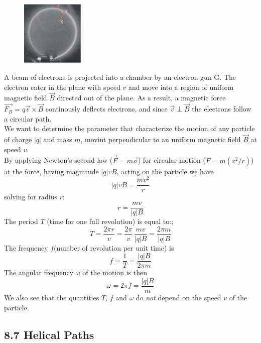\documentclass[12pt, a4paper]{article}
\begin{document}
		\begin{figure}
			\centering
			\includegraphics[width=3cm]{Physics2_PNGs/electron-magn-field.png}
			\caption*{}
			\label{fig:electron-magn-field.png}
		\end{figure}
		A beam of electrons is projected into a chamber by an electron gun G. The electron enter in the plane with speed $v$ and move into a region of uniform magnetic field $\vec{B}$ directed out of the plane. As a result, a magnetic force $\vec{F_B} = q \vec{v} \times \vec{B}$ continously deflects electrons, and since $\vec{v} \perp \vec{B}$ the electrons follow a circular path. \\
		We want to determine the parameter that characterize the motion of any particle of charge $|q|$ and mass $m$, movint perpendicular to an uniform magnetic field $\vec{B}$ at speed $v$. \\
		By applying Newton's second law ($\vec{F} = m \vec{a}$) for circular motion ($F = m(v^2/r)$) at the force, having magnitude $|q|vB$, acting on the particle we have
		\[
			|q|vB = \frac{mv^2}{r}
			\tag{8-7}
		\]
		solving for radius $r$:
		\[
			r = \frac{mv}{|q|B}
			\tag{Radius, 8-8}
		\]
		The period $T$ (time for one full revolution) is equal to:;
		\[
			T = \frac{2 \pi r}{v} = \frac{2 \pi}{v} \, \frac{mv}{|q| B}
			  = \frac{2 \pi m}{|q| B}
			\tag{Period, 8-9}
		\]
		The frequency $f$(number of revolution per unit time) is
		\[
			f = \frac{1}{T} = \frac{|q| B}{2 \pi m}
			\tag{Frequency, 8-10}
		\]
		The angular frequency $\omega$ of the motion is then
		\[
			\omega = 2 \pi f = \frac{|q| B}{m}
			\tag{Angular Frequency, 8-11}
		\]
		We also see that the quantities $T$, $f$ and $\omega$ do \textit{not} depend on the speed $v$ of the particle.
 		
		
		
		\subsection*{8.7 Helical Paths}
		
\end{document}
